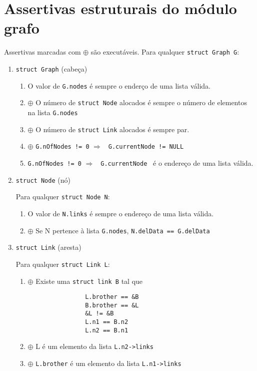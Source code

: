 \documentclass[a4paper,8pt]{article}
\begin{document}
\section{Assertivas estruturais do módulo grafo}

Assertivas marcadas com $\oplus$ são executáveis.\newline
Para qualquer \texttt{struct Graph G}:
\begin{enumerate}

\item \texttt{struct Graph} (cabeça)
	\begin{enumerate}
		\item O valor de \texttt{G.nodes} é sempre o enderço de uma
			lista válida.
		\item $\oplus$ O número de \texttt{struct Node} alocados é sempre
			o número de elementos na lista \texttt{G.nodes}
		\item $\oplus$ O número de \texttt{struct Link} alocados é sempre par.
		\item $\oplus$ \texttt{G.nOfNodes != 0} $\Rightarrow$
			\texttt{ G.currentNode != NULL}
		\item \texttt{G.nOfNodes != 0} $\Rightarrow$
			\texttt{ G.currentNode } é o endereço de uma lista válida.
	\end{enumerate}

\item \texttt{struct Node} (nó)

	Para qualquer \texttt{struct Node N}:
	\begin{enumerate}
		\item O valor de \texttt{N.links} é sempre o endereço de uma lista válida.
		\item $\oplus$ Se N pertence à lista \texttt{G.nodes},
			\texttt{N.delData == G.delData}
	\end{enumerate}

\item \texttt{struct Link} (aresta)

	Para qualquer \texttt{struct Link L}:
	\begin{enumerate}
		\item $\oplus$ Existe uma \texttt{struct link B} tal que
			\begin{verbatim}
				L.brother == &B
				B.brother == &L
				&L != &B
				L.n1 == B.n2
				L.n2 == B.n1
			\end{verbatim}
		\item $\oplus$ L é um elemento da lista \texttt{L.n2->links}
		\item $\oplus$ \texttt{L.brother} é um elemento da lista
			\texttt{L.n1->links}
	\end{enumerate}
\end{enumerate}
\end{document}
